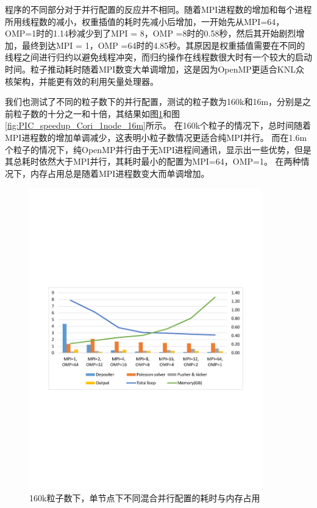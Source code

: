 程序的不同部分对于并行配置的反应并不相同。随着MPI进程数的增加和每个进程所用线程数的减小，权重插值的耗时先减小后增加，一开始先从MPI=64，OMP=1时的1.14秒减少到了MPI = 8，OMP =8时的0.58秒，然后其开始剧烈增加，最终到达MPI = 1，OMP =64时的4.85秒。其原因是权重插值需要在不同的线程之间进行归约以避免线程冲突，而归约操作在线程数很大时有一个较大的启动时间。粒子推动耗时随着MPI数变大单调增加，这是因为OpenMP更适合KNL众核架构，并能更有效的利用矢量处理器。

我们也测试了不同的粒子数下的并行配置，测试的粒子数为160k和16m，分别是之前粒子数的十分之一和十倍，其结果如图\ref{fig:PIC_speedup_Cori_1node_160k}和图\ref{fig:PIC_speedup_Cori_1node_16m}所示。
在160k个粒子的情况下，总时间随着MPI进程数的增加单调减少，这表明小粒子数情况更适合纯MPI并行。
而在1.6m个粒子的情况下，纯OpenMP并行由于无MPI进程间通讯，显示出一些优势，但是其总耗时依然大于MPI并行，其耗时最小的配置为MPI=64，OMP=1。
在两种情况下，内存占用总是随着MPI进程数变大而单调增加。

\begin{figure}[!htb]
  \centering
  \includegraphics[width=0.9\textwidth]{Img/PIC_speedup_Cori_1node_160k.pdf}
  \caption{160k粒子数下，单节点下不同混合并行配置的耗时与内存占用}
  \label{fig:PIC_speedup_Cori_1node_160k}
\end{figure}

